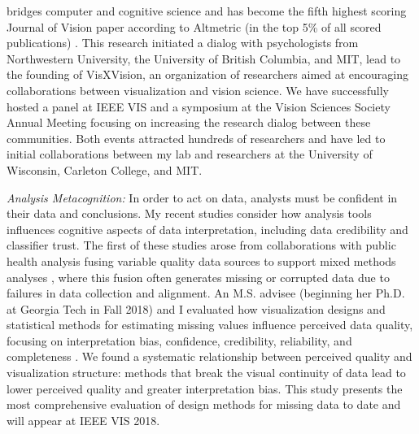 \documentclass[11pt]{article}
\begin{document}
bridges computer and cognitive science and has become the fifth highest scoring Journal of Vision paper according to Altmetric (in the top 5\% of all scored publications) \cite{szafir2016Four}. This research initiated a dialog with psychologists from Northwestern University, the University of British Columbia, and MIT, lead to the founding of VisXVision, an organization of researchers aimed at encouraging collaborations between visualization and vision science. We have successfully hosted a panel at IEEE VIS and a symposium at the Vision Sciences Society Annual Meeting focusing on increasing the research dialog between these communities. Both events attracted hundreds of researchers and have led to initial collaborations between my lab and researchers at the University of Wisconsin, Carleton College, and MIT. 

\emph{Analysis Metacognition: }In order to act on data, analysts must be confident in their data and conclusions. My recent studies 
consider how analysis tools influences cognitive aspects of data interpretation, including data credibility and classifier trust. 
The first of these studies arose from 
collaborations with public health analysis 
fusing variable quality data sources to support mixed methods analyses \cite{pruss2018Zika}, where this fusion often generates
missing or corrupted data due to failures in data collection and alignment. An M.S. advisee (beginning her Ph.D. at Georgia Tech in Fall 2018) and I evaluated how visualization designs and statistical methods for estimating missing values influence perceived data quality, focusing on interpretation bias, confidence, credibility, reliability, and completeness \cite{song2019Wheres}. We found a systematic relationship between perceived quality and visualization structure: methods that break the visual continuity of data lead to lower perceived quality and greater interpretation bias. This study presents the most comprehensive evaluation of design methods for missing data to date and will appear at IEEE VIS 2018. 
\end{document}

